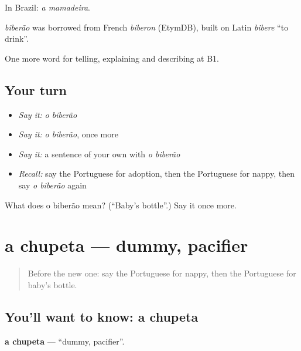 In Brazil: \emph{a mamadeira}.

\begin{cousinweb}
\emph{biberão} was borrowed from French \emph{biberon} (EtymDB), built on Latin \emph{bibere} \textquotedblleft{}to drink\textquotedblright{}.
\end{cousinweb}

\begin{grammarlens}[title={What you've built}]
One more word for telling, explaining and describing at B1.
\end{grammarlens}

\subsection*{Your turn}
\begin{itemize}
\raggedright
  \item \emph{Say it:} \emph{o biberão}
  \item \emph{Say it:} \emph{o biberão}, once more
  \item \emph{Say it:} a sentence of your own with \emph{o biberão}
  \item \emph{Recall:} say the Portuguese for adoption, then the Portuguese for nappy, then say \emph{o biberão} again
\end{itemize}

\begin{tcolorbox}[breakable,colback=teal!4,colframe=teal!35!black,title={Before you move on}]
What does o biberão mean? (\textquotedblleft{}Baby's bottle\textquotedblright{}.) Say it once more.
\end{tcolorbox}
\section[a chupeta]{a chupeta — dummy, pacifier}

\label{lesson:PT-C494-chupeta}



\begin{quote}
Before the new one: say the Portuguese for nappy, then the Portuguese for baby's bottle.
\end{quote}

\subsection*{You'll want to know: a chupeta}
\textbf{a chupeta} — \textquotedblleft{}dummy, pacifier\textquotedblright{}.


